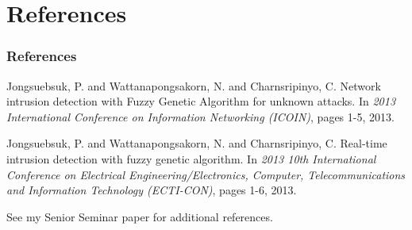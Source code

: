 \documentclass{beamer}
\newcommand{\linespace}{\vskip 0.25cm}
\begin{document}
\section*{References}

\begin{frame} 
	\frametitle{References} 
	
	\begin{thebibliography}{lskdjf}
	
	\begin{small}
Jongsuebsuk, P. and Wattanapongsakorn, N. and Charnsripinyo, C.
\newblock Network intrusion detection with Fuzzy Genetic Algorithm for unknown attacks.
\newblock In \emph{2013 International Conference on Information Networking (ICOIN)}, pages 1-5, 2013.
	
	
Jongsuebsuk, P. and Wattanapongsakorn, N. and Charnsripinyo, C.
\newblock Real-time intrusion detection with fuzzy genetic algorithm.
\newblock In \emph{2013 10th International Conference on Electrical Engineering/Electronics, Computer, Telecommunications and Information Technology (ECTI-CON)}, pages 1-6, 2013.
	\end{small}
	
  	\end{thebibliography}
  	
  	\linespace
  	
  	\begin{center}
  	\begin{small}
  	See my Senior Seminar paper for additional references.
  	\end{small}
  	\end{center}
	
\end{frame} 
\end{document}
